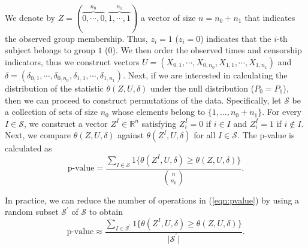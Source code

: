 \documentclass[11pt]{article}
\begin{document}


We denote by $Z=(\overbrace{0,\cdots,0}^{n_0},\overbrace{1,\cdots,1}^{n_1})$ a vector of size $n=n_0+n_1$ that  indicates  the observed  group  membership. Thus,  $z_i = 1$ ($z_i = 0$) indicates   that the $i$-th  subject  belongs to group $1$  ($0$).  We then order the observed  times and  censorship indicators, thus we  construct   vectors
 $U= (X_{0,1},\cdots, X_{0,n_0},X_{1,1},\cdots ,X_{1,n_1})$ and $\delta=(\delta_{0,1},\cdots ,\delta_{0,n_0},\delta_{1,1},\cdots ,\delta_{1,n_1})$. Next,  if we are interested in calculating the  distribution of the statistic  $\theta (Z, U,\delta)$ under the null distribution ($P_0 = P_1$), then we can proceed to construct permutations of the  data. Specifically, let $\mathcal{S}$ be  a collection  of sets of size  $n_0$  whose elements  belong  to $\{1,\ldots, n_0 + n_1\}$. For  every  $I \in \mathcal{S}$, we  construct  a vector $Z^{I} \in \mathbb{R}^n$
 satisfying $Z_i^I = 0 $  if  $i \in I$ and  $Z_i^I  =  1$  if  $i \notin I$. Next, we compare $\theta(Z,U,\delta)$  against $\theta(Z^I,U,\delta)$  for all $I \in \mathcal{S}$. The p-value is calculated  as
\begin{equation}
\label{eqn:pvalue}
\text{p-value}=\frac{\sum_{ I \in  \mathcal{S} }1\{{\theta(Z^I,U,\delta)\geq \theta(Z,U,\delta)\}}}{\binom{n}{n_0}}.
\end{equation}

In practice, we can reduce  the number of operations in (\ref{eqn:pvalue}) by using a random  subset $\mathcal{S}^{\prime}$  of $\mathcal{S}$ to  obtain
\begin{equation*}
\text{p-value}\approx \frac{\sum_{ I \in  \mathcal{S}^{\prime} }1\{{\theta(Z^I,U,\delta)\geq \theta(Z,U,\delta)\}}}{  \vert \mathcal{S}^{\prime}\vert }.
\end{equation*}
\end{document}
